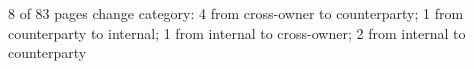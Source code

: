 8 of 83 pages change category: 4 from cross-owner to counterparty; 1 from counterparty to internal; 1 from internal to cross-owner; 2 from internal to counterparty